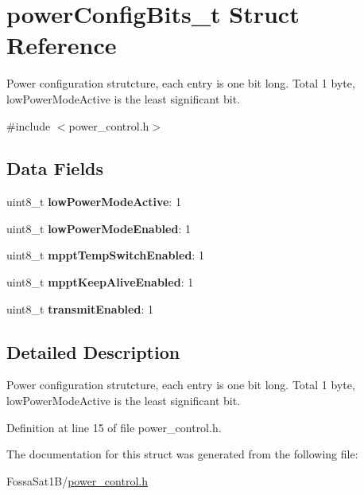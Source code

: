 \hypertarget{structpower_config_bits__t}{}\section{power\+Config\+Bits\+\_\+t Struct Reference}
\label{structpower_config_bits__t}


Power configuration strutcture, each entry is one bit long. Total 1 byte, low\+Power\+Mode\+Active is the least significant bit.  




{\ttfamily \#include $<$power\+\_\+control.\+h$>$}

\subsection*{Data Fields}
\begin{DoxyCompactItemize}
\item 
\mbox{\label{structpower_config_bits__t_aee72a13a91270d9fa387524b1d92dff8}} 
uint8\+\_\+t {\bfseries low\+Power\+Mode\+Active}\+: 1
\item 
\mbox{\label{structpower_config_bits__t_a3f4d8faa57c2a6bfbbfb3e7771e4c73b}} 
uint8\+\_\+t {\bfseries low\+Power\+Mode\+Enabled}\+: 1
\item 
\mbox{\label{structpower_config_bits__t_ad16350358127656cb4e94755923e6b96}} 
uint8\+\_\+t {\bfseries mppt\+Temp\+Switch\+Enabled}\+: 1
\item 
\mbox{\label{structpower_config_bits__t_aad7dea2284fd52c9900003dabaf950c6}} 
uint8\+\_\+t {\bfseries mppt\+Keep\+Alive\+Enabled}\+: 1
\item 
\mbox{\label{structpower_config_bits__t_a6b88402c62ae43ff15edf6e38997178a}} 
uint8\+\_\+t {\bfseries transmit\+Enabled}\+: 1
\end{DoxyCompactItemize}


\subsection{Detailed Description}
Power configuration strutcture, each entry is one bit long. Total 1 byte, low\+Power\+Mode\+Active is the least significant bit. 

Definition at line 15 of file power\+\_\+control.\+h.



The documentation for this struct was generated from the following file\+:\begin{DoxyCompactItemize}
\item 
Fossa\+Sat1\+B/\hyperlink{power__control_8h}{power\+\_\+control.\+h}\end{DoxyCompactItemize}
